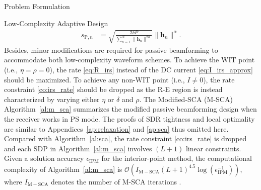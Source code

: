 \documentclass[journal]{IEEEtran}
\begin{document}
\begin{section}{Problem Formulation}
\begin{subsection}{Low-Complexity Adaptive Design}
\begin{align}
				s_{\mathrm{P}, n} &= \sqrt{\frac{2 \delta P}{\sum_{n=1}^N \lVert{\boldsymbol{h}_n \rVert^{2 \alpha}}}}\lVert{\boldsymbol{h}_n}\rVert^\alpha. \label{eq:s_p}
			\end{align}
			Besides, minor modifications are required for passive beamforming to accommodate both low-complexity waveform schemes. To achieve the WIT point (i.e., $\eta=\rho=0$), the rate \eqref{eq:R_irs} instead of the DC current \eqref{eq:I_irs_approx} should be maximized. To achieve any non-WIT point (i.e., $I \ne 0$), the rate constraint \eqref{co:irs_rate} should be dropped as the R-E region is instead characterized by varying either $\eta$ or $\delta$ and $\rho$. The Modified-SCA (M-SCA) Algorithm~\ref{al:m_sca} summarizes the modified passive beamforming design when the receiver works in PS mode. The proofs of SDR tightness and local optimality are similar to Appendices~\ref{ap:relaxation} and \ref{ap:sca} thus omitted here. Compared with Algorithm~\ref{al:sca}, the rate constraint \eqref{co:irs_rate} is dropped and each SDP in Algorithm~\ref{al:m_sca} involves $(L+1)$ linear constraints. Given a solution accuracy $\epsilon_{\mathrm{IPM}}$ for the interior-point method, the computational complexity of Algorithm~\ref{al:m_sca} is $\mathcal{O}\left(I_{\mathrm{M-SCA}}(L+1)^{4.5} \log(\epsilon_{\mathrm{IPM}}^{-1})\right)$, where $I_{\mathrm{M-SCA}}$ denotes the number of M-SCA iterations \cite{Luo2010}.


\end{subsection}
\end{section}
\end{document}
